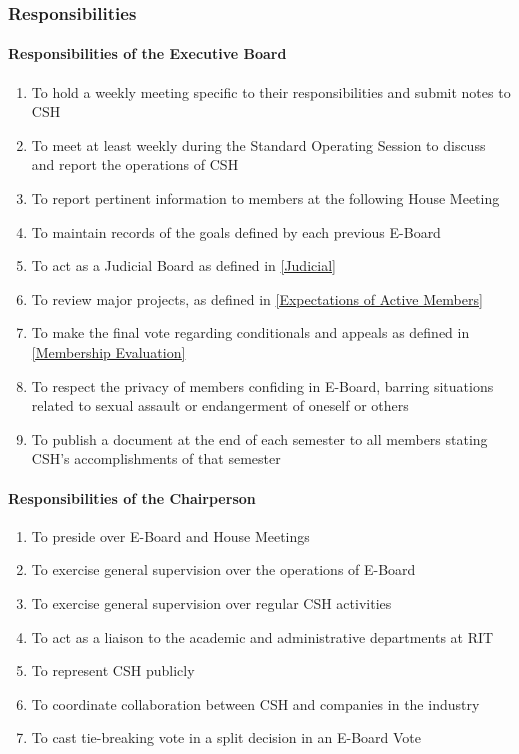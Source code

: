 \documentclass{article}
\newcommand{\asubsection}[1]{\subsubsection{#1} \label{#1}}
\newcommand{\asubsubsection}[1]{\paragraph{#1} \label{#1}}
\begin{document}
\asubsection{Responsibilities}
\renewcommand{\theenumi}{\alph{enumi}} %

\asubsubsection{Responsibilities of the Executive Board}
\renewcommand{\theenumi}{\arabic{enumi}} %
\begin{enumerate}
	\item To hold a weekly meeting specific to their responsibilities and submit notes to CSH
	\item To meet at least weekly during the Standard Operating Session to discuss and report the operations of CSH
	\item To report pertinent information to members at the following House Meeting
	\item To maintain records of the goals defined by each previous E-Board
	\item To act as a Judicial Board as defined in \ref{Judicial}
	\item To review major projects, as defined in \ref{Expectations of Active Members}
	\item To make the final vote regarding conditionals and appeals as defined in \ref{Membership Evaluation}
	\item To respect the privacy of members confiding in E-Board, barring situations related to sexual assault or endangerment of oneself or others
	\item To publish a document at the end of each semester to all members stating CSH's accomplishments of that semester
\end{enumerate}

\asubsubsection{Responsibilities of the Chairperson}
\begin{enumerate}
	\item To preside over E-Board and House Meetings
	\item To exercise general supervision over the operations of E-Board
	\item To exercise general supervision over regular CSH activities
	\item To act as a liaison to the academic and administrative departments at RIT
	\item To represent CSH publicly
	\item To coordinate collaboration between CSH and companies in the industry
	\item To cast tie-breaking vote in a split decision in an E-Board Vote
\end{enumerate}
\end{document}

